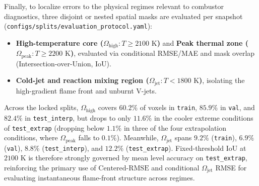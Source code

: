 Finally, to localize errors to the physical regimes relevant to combustor diagnostics, three disjoint or nested spatial masks are evaluated per snapshot (\texttt{configs/splits/evaluation\_protocol.yaml}):
\begin{itemize}
    \item \textbf{High-temperature core ($\Omega_{\text{high}}: T \ge 2100\text{ K}$)} and \textbf{Peak thermal zone ($\Omega_{\text{peak}}: T \ge 2200\text{ K}$)}, evaluated via conditional RMSE/MAE and mask overlap (Intersection-over-Union, IoU).
    \item \textbf{Cold-jet and reaction mixing region ($\Omega_{\text{jet}}: T < 1800\text{ K}$)}, isolating the high-gradient flame front and unburnt V-jets.
\end{itemize}
Across the locked splits, $\Omega_{\text{high}}$ covers $60.2\%$ of voxels in \texttt{train}, $85.9\%$ in \texttt{val}, and $82.4\%$ in \texttt{test\_interp}, but drops to only $11.6\%$ in the cooler extreme conditions of \texttt{test\_extrap} (dropping below $1.1\%$ in three of the four extrapolation conditions, where $\Omega_{\text{peak}}$ falls to $0.1\%$). Meanwhile, $\Omega_{\text{jet}}$ spans $9.2\%$ (\texttt{train}), $6.9\%$ (\texttt{val}), $8.8\%$ (\texttt{test\_interp}), and $12.2\%$ (\texttt{test\_extrap}). Fixed-threshold IoU at $2100\text{ K}$ is therefore strongly governed by mean level accuracy on \texttt{test\_extrap}, reinforcing the primary use of $\text{Centered-RMSE}$ and conditional $\Omega_{\text{jet}}$ RMSE for evaluating instantaneous flame-front structure across regimes.
